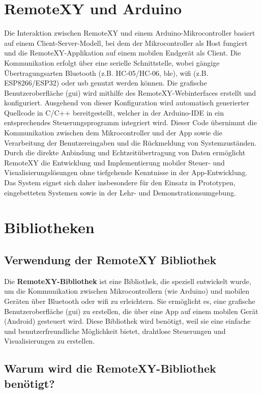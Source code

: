 \section{RemoteXY und Arduino}

Die Interaktion zwischen RemoteXY und einem Arduino-Mikrocontroller basiert auf einem Client-Server-Modell, bei dem der Mikrocontroller als Host fungiert und die RemoteXY-Applikation auf einem mobilen Endgerät als Client. Die Kommunikation erfolgt über eine serielle Schnittstelle, wobei gängige Übertragungsarten Bluetooth (z.B. HC-05/HC-06, \ac{ble}), \ac{wifi} (z.B. ESP8266/ESP32) oder \ac{usb} genutzt werden können.
Die grafische Benutzeroberfläche (\ac{gui}) wird mithilfe des RemoteXY-Webinterfaces erstellt und konfiguriert. Ausgehend von dieser Konfiguration wird automatisch generierter Quellcode in C/C++ bereitgestellt, welcher in der Arduino-IDE in ein entsprechendes Steuerungsprogramm integriert wird. Dieser Code übernimmt die Kommunikation zwischen dem Mikrocontroller und der App sowie die Verarbeitung der Benutzereingaben und die Rückmeldung von Systemzuständen.
Durch die direkte Anbindung und Echtzeitübertragung von Daten ermöglicht RemoteXY die Entwicklung und Implementierung mobiler Steuer- und Visualisierungslösungen ohne tiefgehende Kenntnisse in der App-Entwicklung. Das System eignet sich daher insbesondere für den Einsatz in Prototypen, eingebetteten Systemen sowie in der Lehr- und Demonstrationsumgebung.

\section{Bibliotheken}
\subsection{Verwendung der RemoteXY Bibliothek}
\label{RemoteXYBibliothek}

Die \textbf{RemoteXY-Bibliothek} ist eine Bibliothek, die speziell entwickelt wurde, um die Kommunikation zwischen Mikrocontrollern (wie Arduino) und mobilen Geräten über Bluetooth oder \ac{wifi} zu erleichtern. Sie ermöglicht es, eine grafische Benutzeroberfläche (\ac{gui}) zu erstellen, die über eine App auf einem mobilen Gerät (Android) gesteuert wird. Diese Bibliothek wird benötigt, weil sie eine einfache und benutzerfreundliche Möglichkeit bietet, drahtlose Steuerungen und Visualisierungen zu erstellen.

\subsection{Warum wird die RemoteXY-Bibliothek benötigt?}

